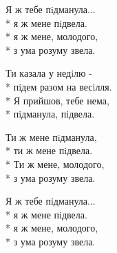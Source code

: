 \medskip

\begin{minipage}{\linewidth}
\hspace*{1.5em}Я ж тебе пiдманула...\\*
\hspace*{1.5em}я ж мене пiдвела.\\*
\hspace*{1.5em}я ж мене, молодого,\\*
\hspace*{1.5em}з ума розуму звела.\\
\end{minipage}\par\medskip\nobreak

\medskip

\begin{minipage}{\linewidth}
Ти казала у недiлю -\\*
пiдем разом на весiлля.\\*
Я прийшов, тебе нема,\\*
пiдманула, пiдвела.\\
\end{minipage}\par\medskip\nobreak

\medskip

\begin{minipage}{\linewidth}
\hspace*{1.5em}Ти ж мене пiдманула,\\*
\hspace*{1.5em}ти ж мене пiдвела.\\*
\hspace*{1.5em}Ти ж мене, молодого,\\*
\hspace*{1.5em}з ума розуму звела.\\
\end{minipage}\par\medskip\nobreak

\medskip

\begin{minipage}{\linewidth}
\hspace*{1.5em}Я ж тебе пiдманула...\\*
\hspace*{1.5em}я ж мене пiдвела.\\*
\hspace*{1.5em}я ж мене, молодого,\\*
\hspace*{1.5em}з ума розуму звела.\\
\end{minipage}

